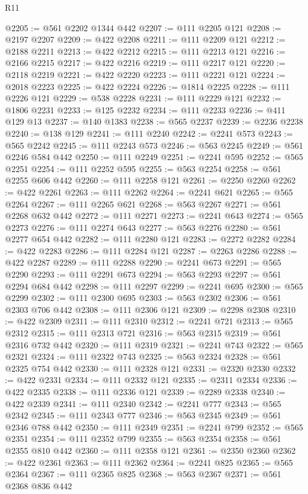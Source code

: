 \begin{lexlean}{R11}
\begin{coremodule}
@2205 := @561 @2202 @1344 @442
@2207 := @111 @2205 @121
@2208 := @2197 @2207
@2209 := @422 @2208
@2211 := @111 @2209 @121
@2212 := @2188 @2211
@2213 := @422 @2212
@2215 := @111 @2213 @121
@2216 := @2166 @2215
@2217 := @422 @2216
@2219 := @111 @2217 @121
@2220 := @2118 @2219
@2221 := @422 @2220
@2223 := @111 @2221 @121
@2224 := @2018 @2223
@2225 := @422 @2224
@2226 := @1814 @2225
@2228 := @111 @2226 @121
@2229 := @538 @2228
@2231 := @111 @2229 @121
@2232 := @1806 @2231
@2233 := @125 @2232
@2234 := @111 @2233
@2236 := @411 @129 @13
@2237 := @140 @1383
@2238 := @565 @2237
@2239 := @2236 @2238
@2240 := @138 @129
@2241 := @111 @2240
@2242 := @2241 @573
@2243 := @565 @2242
@2245 := @111 @2243 @573
@2246 := @563 @2245
@2249 := @561 @2246 @584 @442
@2250 := @111 @2249
@2251 := @2241 @595
@2252 := @565 @2251
@2254 := @111 @2252 @595
@2255 := @563 @2254
@2258 := @561 @2255 @606 @442
@2260 := @111 @2258 @121
@2261 := @2250 @2260
@2262 := @422 @2261
@2263 := @111 @2262
@2264 := @2241 @621
@2265 := @565 @2264
@2267 := @111 @2265 @621
@2268 := @563 @2267
@2271 := @561 @2268 @632 @442
@2272 := @111 @2271
@2273 := @2241 @643
@2274 := @565 @2273
@2276 := @111 @2274 @643
@2277 := @563 @2276
@2280 := @561 @2277 @654 @442
@2282 := @111 @2280 @121
@2283 := @2272 @2282
@2284 := @422 @2283
@2286 := @111 @2284 @121
@2287 := @2263 @2286
@2288 := @422 @2287
@2289 := @111 @2288
@2290 := @2241 @673
@2291 := @565 @2290
@2293 := @111 @2291 @673
@2294 := @563 @2293
@2297 := @561 @2294 @684 @442
@2298 := @111 @2297
@2299 := @2241 @695
@2300 := @565 @2299
@2302 := @111 @2300 @695
@2303 := @563 @2302
@2306 := @561 @2303 @706 @442
@2308 := @111 @2306 @121
@2309 := @2298 @2308
@2310 := @422 @2309
@2311 := @111 @2310
@2312 := @2241 @721
@2313 := @565 @2312
@2315 := @111 @2313 @721
@2316 := @563 @2315
@2319 := @561 @2316 @732 @442
@2320 := @111 @2319
@2321 := @2241 @743
@2322 := @565 @2321
@2324 := @111 @2322 @743
@2325 := @563 @2324
@2328 := @561 @2325 @754 @442
@2330 := @111 @2328 @121
@2331 := @2320 @2330
@2332 := @422 @2331
@2334 := @111 @2332 @121
@2335 := @2311 @2334
@2336 := @422 @2335
@2338 := @111 @2336 @121
@2339 := @2289 @2338
@2340 := @422 @2339
@2341 := @111 @2340
@2342 := @2241 @777
@2343 := @565 @2342
@2345 := @111 @2343 @777
@2346 := @563 @2345
@2349 := @561 @2346 @788 @442
@2350 := @111 @2349
@2351 := @2241 @799
@2352 := @565 @2351
@2354 := @111 @2352 @799
@2355 := @563 @2354
@2358 := @561 @2355 @810 @442
@2360 := @111 @2358 @121
@2361 := @2350 @2360
@2362 := @422 @2361
@2363 := @111 @2362
@2364 := @2241 @825
@2365 := @565 @2364
@2367 := @111 @2365 @825
@2368 := @563 @2367
@2371 := @561 @2368 @836 @442

\end{coremodule}
\end{lexlean}
